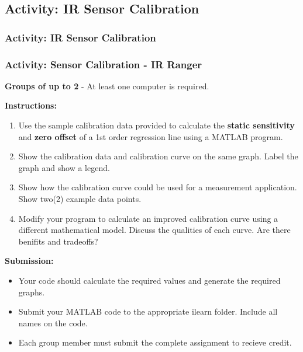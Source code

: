 \documentclass[fleqn]{beamer} %
\newcommand{\sectionIIIsubsectionVtitle}{Activity: IR Sensor Calibration}
\begin{document}
		\subsection{\sectionIIIsubsectionVtitle}\label{sectionIIIsubsectionV}	

			\begin{frame}
				\frametitle{\sectionIIIsubsectionVtitle}

				\frametitle{ Activity: Sensor Calibration - IR Ranger} 

	\textbf{Groups of up to 2} - At least one computer is required.


	\textbf{Instructions:}
	\begin{enumerate} \scriptsize
		\item Use the sample calibration data provided to calculate the {\bf static sensitivity} and {\bf zero offset} of a 1st order regression line using a MATLAB program.  
		\item Show the calibration data and calibration curve on the same graph. Label the graph and show a legend.
		\item Show how the calibration curve could be used for a measurement application. Show two(2) example data points. 
		\item Modify your program to calculate an improved calibration curve using a different mathematical model. Discuss the qualities of each curve. Are there benifits and tradeoffs?
	\end{enumerate}


	\textbf{Submission:}
	\begin{itemize}\scriptsize
		\item Your code should calculate the required values and generate the required graphs. 
		\item Submit your MATLAB code to the appropriate ilearn folder. Include all names on the code. 
		\item Each group member must submit the complete assignment to recieve credit. 
	\end{itemize}


				\end{frame}
\end{document}
